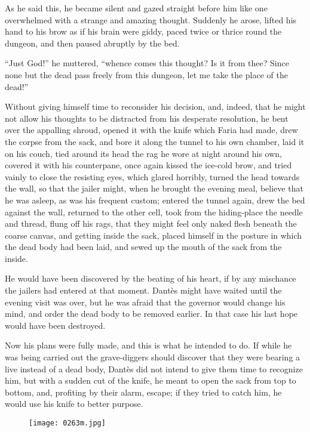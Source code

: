As he said this, he became silent and gazed straight before him like
one overwhelmed with a strange and amazing thought. Suddenly he arose,
lifted his hand to his brow as if his brain were giddy, paced twice or
thrice round the dungeon, and then paused abruptly by the bed.

“Just God!” he muttered, “whence comes this thought? Is it from thee?
Since none but the dead pass freely from this dungeon, let me take the
place of the dead!”

Without giving himself time to reconsider his decision, and, indeed,
that he might not allow his thoughts to be distracted from his
desperate resolution, he bent over the appalling shroud, opened it with
the knife which Faria had made, drew the corpse from the sack, and bore
it along the tunnel to his own chamber, laid it on his couch, tied
around its head the rag he wore at night around his own, covered it
with his counterpane, once again kissed the ice-cold brow, and tried
vainly to close the resisting eyes, which glared horribly, turned the
head towards the wall, so that the jailer might, when he brought the
evening meal, believe that he was asleep, as was his frequent custom;
entered the tunnel again, drew the bed against the wall, returned to
the other cell, took from the hiding-place the needle and thread, flung
off his rags, that they might feel only naked flesh beneath the coarse
canvas, and getting inside the sack, placed himself in the posture in
which the dead body had been laid, and sewed up the mouth of the sack
from the inside.

He would have been discovered by the beating of his heart, if by any
mischance the jailers had entered at that moment. Dantès might have
waited until the evening visit was over, but he was afraid that the
governor would change his mind, and order the dead body to be removed
earlier. In that case his last hope would have been destroyed.

Now his plans were fully made, and this is what he intended to do. If
while he was being carried out the grave-diggers should discover that
they were bearing a live instead of a dead body, Dantès did not intend
to give them time to recognize him, but with a sudden cut of the knife,
he meant to open the sack from top to bottom, and, profiting by their
alarm, escape; if they tried to catch him, he would use his knife to
better purpose.

\begin{figure}[ht]
\texttt{[image: 0263m.jpg]}
\end{figure}

